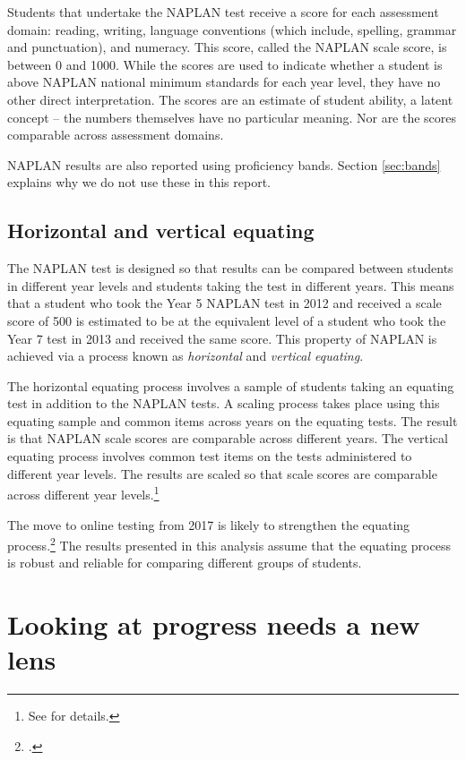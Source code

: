 Students that undertake the NAPLAN test receive a score for each assessment domain: reading, writing, language conventions (which include, spelling, grammar and punctuation), and numeracy. This score, called the NAPLAN scale score, is between 0 and 1000. While the scores are used to indicate whether a student is above NAPLAN national minimum standards for each year level, they have no other direct interpretation. The scores are an estimate of student ability, a latent concept -- the numbers themselves have no particular meaning. Nor are the scores comparable across assessment domains.

NAPLAN results are also reported using proficiency bands. Section \ref{sec:bands} explains why we do not use these in this report.

\subsection{Horizontal and vertical equating}

The NAPLAN test is designed so that results can be compared between students in different year levels and students taking the test in different years. This means that a student who took the Year 5 NAPLAN test in 2012 and received a scale score of 500 is estimated to be at the equivalent level of a student who took the Year 7 test in 2013 and received the same score. This property of NAPLAN is achieved via a process known as \textit{horizontal} and \textit{vertical equating}.

The horizontal equating process involves a sample of students taking an equating test in addition to the NAPLAN tests. A scaling process takes place using this equating sample and common items across years on the equating tests. The result is that NAPLAN scale scores are comparable across different years. The vertical equating process involves common test items on the tests administered to different year levels. The results are scaled so that scale scores are comparable across different year levels.\footnote{See \textcite[][40--72]{acara2015a} for details.}

The move to online testing from 2017 is likely to strengthen the equating process.\footcite{acara2015b} The results presented in this analysis assume that the equating process is robust and reliable for comparing different groups of students.

\section{Looking at progress needs a new lens}

